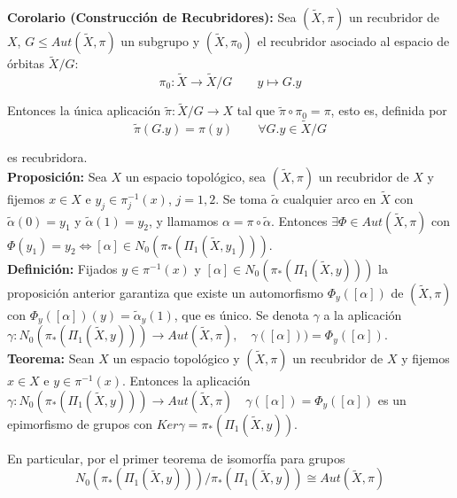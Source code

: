 \documentclass{article}
\begin{document}
\textbf{Corolario (Construcción de Recubridores):} Sea $(\tilde{X},\pi)$ un recubridor de $X$, $G\leq Aut(\tilde{X},\pi)$ un subgrupo y $(\tilde{X},\pi_0)$ el recubridor asociado al espacio de órbitas $\tilde{X}/G$:
\begin{equation*}
\pi_0:\tilde{X}\rightarrow \tilde{X}/G\qquad y\mapsto G.y
\end{equation*}

Entonces la única aplicación $\tilde{\pi}:\tilde{X}/G\rightarrow X$ tal que $\tilde{\pi}\circ\pi_0=\pi$, esto es, definida por
\begin{equation*}
\tilde{\pi}(G.y)=\pi(y)\qquad\forall G.y\in \tilde{X}/G
\end{equation*}

es recubridora.\\

\textbf{Proposición:} Sea $X$ un espacio topológico, sea $(\tilde{X},\pi)$ un recubridor de $X$ y fijemos $x\in X$ e $y_j\in \pi_j^{-1}(x)$, $j=1,2$. Se toma $\tilde{\alpha}$ cualquier arco en $\tilde{X}$ con $\tilde{\alpha}(0)=y_1$ y $\tilde{\alpha}(1)=y_2$, y llamamos $\alpha = \pi\circ \tilde{\alpha}$. Entonces $\exists\Phi \in Aut(\tilde{X},\pi)$ con $\Phi(y_1)=y_2\Leftrightarrow [\alpha]\in N_0(\pi_*(\Pi_1(\tilde{X},y_1)))$.\\

\textbf{Definición:} Fijados $y\in \pi^{-1}(x)$ y $[\alpha]\in N_0(\pi_*(\Pi_1(\tilde{X},y)))$ la proposición anterior garantiza que existe un automorfismo $\Phi_y([\alpha])$ de $(\tilde{X},\pi)$ con $\Phi_y([\alpha])(y)=\tilde{\alpha}_y(1)$, que es único. Se denota $\gamma$ a la aplicación $\gamma:N_0(\pi_*(\Pi_1(\tilde{X},y)))\rightarrow Aut(\tilde{X},\pi),\quad \gamma([\alpha]))=\Phi_y([\alpha])$.\\

\textbf{Teorema:} Sean $X$ un espacio topológico y $(\tilde{X},\pi)$ un recubridor de $X$ y fijemos $x\in X$ e $y\in \pi^{-1}(x)$. Entonces la aplicación $\gamma:N_0\left(\pi_*\left(\Pi_1(\tilde{X},y)\right)\right) \rightarrow Aut(\tilde{X},\pi)\quad \gamma([\alpha])=\Phi_y([\alpha])$ es un epimorfismo de grupos con $Ker \gamma = \pi_*(\Pi_1(\tilde{X},y))$.

En particular, por el primer teorema de isomorfía para grupos
\begin{equation*}
N_0\left(\pi_*\left(\Pi_1(\tilde{X},y)\right)\right)/\pi_*\left(\Pi_1(\tilde{X},y)\right)\cong Aut(\tilde{X},\pi)
\end{equation*} 
\end{document}
